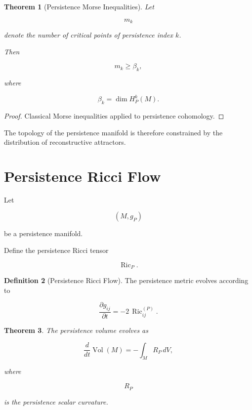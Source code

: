 \documentclass[12pt,oneside]{article}
\newtheorem{theorem}{Theorem}[section] \newtheorem{lemma}[theorem]{Lemma} \newtheorem{proposition}[theorem]{Proposition} \newtheorem{corollary}[theorem]{Corollary}
\theoremstyle{definition}
\newtheorem{definition}[theorem]{Definition} \newtheorem{axiom}[theorem]{Axiom} \newtheorem{remark}[theorem]{Remark} \newtheorem{example}[theorem]{Example}
\begin{document}
\begin{theorem}[Persistence Morse Inequalities]

Let

\[
m_k
\]

denote the number of critical points of persistence index \(k\).

Then

\[
m_k
\ge
\beta_k,
\]

where

\[
\beta_k
=
\dim H_P^k(M).
\]

\end{theorem}

\begin{proof}

Classical Morse inequalities applied to persistence cohomology.

\end{proof}

The topology of the persistence manifold is therefore constrained by the distribution of reconstructive attractors.

\section{Persistence Ricci Flow}

Let

\[
(M,g_P)
\]

be a persistence manifold.

Define the persistence Ricci tensor

\[
\operatorname{Ric}_P.
\]

\begin{definition}[Persistence Ricci Flow]

The persistence metric evolves according to

\[
\frac{\partial g_{ij}}
{\partial t}
=
-2\,\operatorname{Ric}_{ij}^{(P)}.
\]

\end{definition}

\begin{theorem}

The persistence volume evolves as

\[
\frac{d}{dt}
\operatorname{Vol}(M)
=
-
\int_M
R_P
\,dV,
\]

where

\[
R_P
\]

is the persistence scalar curvature.

\end{theorem}
\end{document}

